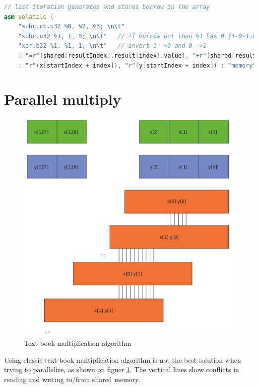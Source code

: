 \documentclass[oneside,openright,12pt,final,en]{mgr}
\begin{document}
\begin{lstlisting}[language=cpp]
// last iteration generates and stores borrow in the array
asm volatile (
	"subc.cc.u32 %0, %2, %3; \n\t"
	"subc.u32 %1, 1, 0; \n\t"	// if borrow out than %1 has 0 (1-0-1=0), else %1 has 1 (1-0-0=1)
	"xor.b32 %1, %1, 1; \n\t"	// invert 1-->0 and 0-->1
	: "=r"(shared[resultIndex].result[index].value), "+r"(shared[resultIndex + 1].borrow)
	: "r"(x[startIndex + index]), "r"(y[startIndex + index]) : "memory");
\end{lstlisting}

\section{Parallel multiply}

\begin{figure}[H]
	\centering
	\includegraphics[width=\textwidth]{al_mull_all}
	\caption{Text-book multiplication algorithm}
	\label{fig:al_mull_all}
\end{figure}

Using classic text-book multiplication algorithm is not the best solution when trying to parallelize, as shown on figuer \ref{fig:al_mull_all}. The vertical lines show conflicts in reading and writing to/from shared memory.
\end{document}
